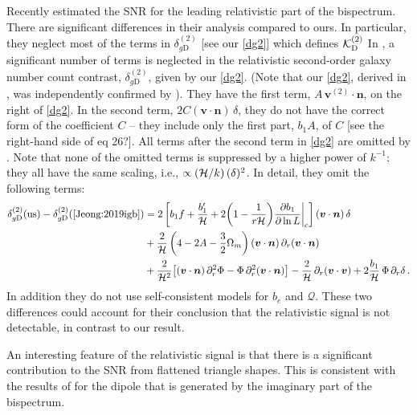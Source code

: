 Recently \cite{Jeong:2019igb} estimated the  SNR for the leading relativistic part of the bispectrum.  There are significant differences in their analysis compared to ours. In particular, they neglect most of the terms in $\delta_{g \mathrm{D}}^{(2)}$ [see our \eqref{dg2}] which defines ${\cal K}^{(2)}_{\mathrm{D}}$ 
In \cite{Jeong:2019igb},  
a significant number of terms is neglected in the relativistic second-order  galaxy number count contrast, $\delta_{g\mathrm{D}}^{(2)}$, given by our \eqref{dg2}. (Note that our  \eqref{dg2}, derived in \cite{Clarkson:2018dwn}, was independently confirmed by \cite{DiDio:2018zmk}). They have the first term, $A\, \bm{v}^{(2)}\!\!\cdot\bm{n}$, on the right of \eqref{dg2}.  In the second term, $2{C}(\bm{v}\cdot\bm{n})\,\delta$, they do not have the correct form of the coefficient $C$ -- they include only the first part, $b_1A$, of $C$ [see the right-hand side of eq 26?]. All terms after the second term in \eqref{dg2} are omitted by \cite{Jeong:2019igb}. Note that none of the omitted terms is suppressed by a higher power of $k^{-1}$;  they all have the same scaling, i.e., $\propto (\mathcal{H}/k)\,{(\delta)^2}$. In detail, they omit the following
terms:
\begin{align}
\delta_{g\mathrm{D}}^{(2)}({\mathrm{us}})- \delta_{g\mathrm{D}}^{(2)}(\mbox{{\cite{Jeong:2019igb}}}) &= 2\left[b_{1}f + \frac{b_1'}{\mathcal{H}} 
+ 2\bigg(1-\frac{1}{{r} \mathcal{H}}\bigg){\frac{\partial b_1}{\partial \ln{L}}\bigg|_{\mathrm{c}}} \right](\bm{v}\cdot\bm{n})\,\delta 
\\\nonumber
& 
+ \frac{2}{\mathcal{H}}\left(4-2A-\frac{3}{2}\Omega_{m} \right)(\bm{v}\cdot\bm{n})\,\partial_r(\bm{v}\cdot\bm{n})\\
\nonumber
&
+ \frac{2}{\mathcal{H}^2}\big[(\bm{v}\cdot\bm{n}) \,\partial_r^2\Phi-\Phi\, \partial_r^2 (\bm{v}\cdot\bm{n}) \big]
 - \frac{2}{\mathcal{H}}\,\partial_r (\bm{v}\cdot\bm{v}) + 2 \frac{b_1}{\mathcal{H}}\,\Phi\, \partial_r\delta \,. 
\end{align} In addition they do not use self-consistent models for $b_{e}$ and $\mathcal{Q}$. These two differences could account for their conclusion that the relativistic signal is not detectable, in contrast to our result. 


An interesting feature of the relativistic signal is that there is a significant contribution to the SNR from  flattened triangle shapes. This is consistent with the results of  \cite{Clarkson:2018dwn} for the dipole that is generated by the imaginary part of the bispectrum.
%
%

